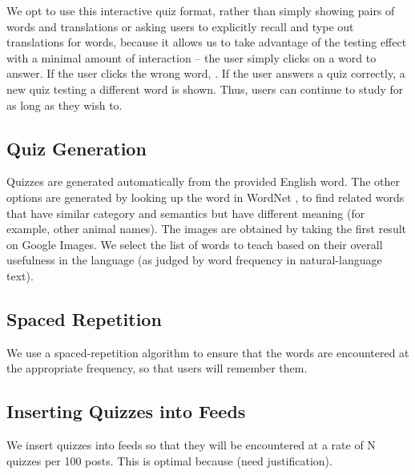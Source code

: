 \documentclass{chi-ext}
\begin{document}

We opt to use this interactive quiz format, rather than simply showing pairs of words and translations or asking users to explicitly recall and type out translations for words, because it allows us to take advantage of the testing effect with a minimal amount of interaction -- the user simply clicks on a word to answer. If the user clicks the wrong word, . If the user answers a quiz correctly, a new quiz testing a different word is shown. Thus, users can continue to study for as long as they wish to.

\subsection{Quiz Generation}

Quizzes are generated automatically from the provided English word. The other options are generated by looking up the word in WordNet \cite{wordnet}, to find related words that have similar category and semantics but have different meaning (for example, other animal names). The images are obtained by taking the first result on Google Images. We select the list of words to teach based on their overall usefulness in the language (as judged by word frequency in natural-language text).

\subsection{Spaced Repetition}

We use a spaced-repetition algorithm to ensure that the words are encountered at the appropriate frequency, so that users will remember them.

\subsection{Inserting Quizzes into Feeds}

We insert quizzes into feeds so that they will be encountered at a rate of N quizzes per 100 posts. This is optimal because (need justification).
\end{document}
